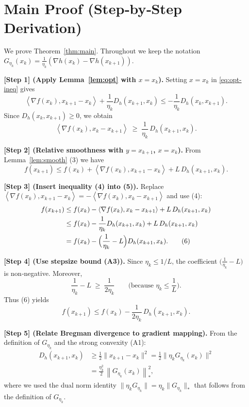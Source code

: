 \documentclass{article}
\newcommand{\grad}{\nabla}
\newcommand{\Dh}{D_h}
\newcommand{\norm}[1]{\left\|#1\right\|}
\newcommand{\inner}[2]{\left\langle #1,#2\right\rangle}
\begin{document}
\section*{Main Proof (Step‑by‑Step Derivation)}
We prove Theorem~\ref{thm:main}. Throughout we keep the notation $G_{\eta_k}(x_k)=\frac{1}{\eta_k}(\nabla h(x_k)-\nabla h(x_{k+1}))$.

\noindent\textbf{[Step 1] (Apply Lemma~\ref{lem:opt} with $x=x_k$).}
Setting $x=x_k$ in \eqref{eq:opt-ineq} gives
\[
\inner{\grad f(x_k)}{x_{k+1}-x_k}
+\frac{1}{\eta_k}\Dh(x_{k+1},x_k)
\le
-\frac{1}{\eta_k}\Dh(x_k,x_{k+1}).
\]
Since $\Dh(x_k,x_{k+1})\ge0$, we obtain
\begin{equation}
\inner{\grad f(x_k)}{x_k-x_{k+1}}
\;\ge\;
\frac{1}{\eta_k}\,\Dh(x_{k+1},x_k). \tag{4}
\end{equation}

\noindent\textbf{[Step 2] (Relative smoothness with $y=x_{k+1}$, $x=x_k$).}
From Lemma~\ref{lem:smooth} (3) we have
\[
f(x_{k+1})\le f(x_k)+\inner{\grad f(x_k)}{x_{k+1}-x_k}+L\,\Dh(x_{k+1},x_k). \tag{5}
\]

\noindent\textbf{[Step 3] (Insert inequality (4) into (5)).}
Replace $\inner{\grad f(x_k)}{x_{k+1}-x_k}= -\inner{\grad f(x_k)}{x_k-x_{k+1}}$ and use (4):
\[
\begin{aligned}
f(x_{k+1})
&\le f(x_k)-\inner{\grad f(x_k)}{x_k-x_{k+1}}+L\,\Dh(x_{k+1},x_k)\\
&\le f(x_k)-\frac{1}{\eta_k}\Dh(x_{k+1},x_k)+L\,\Dh(x_{k+1},x_k)\\
&= f(x_k)-\Bigl(\frac{1}{\eta_k}-L\Bigr)\Dh(x_{k+1},x_k). \tag{6}
\end{aligned}
\]

\noindent\textbf{[Step 4] (Use stepsize bound (A3)).}
Since $\eta_k\le 1/L$, the coefficient $\bigl(\frac{1}{\eta_k}-L\bigr)$ is non‑negative. Moreover,
\[
\frac{1}{\eta_k}-L \;\ge\; \frac{1}{2\eta_k}\qquad\text{(because }\eta_k\le\frac{1}{L}\text{)}.
\]
Thus (6) yields
\begin{equation}
f(x_{k+1})\le f(x_k)-\frac{1}{2\eta_k}\,\Dh(x_{k+1},x_k). \tag{7}
\end{equation}

\noindent\textbf{[Step 5] (Relate Bregman divergence to gradient mapping).}
From the definition of $G_{\eta_k}$ and the strong convexity (A1):
\[
\begin{aligned}
\Dh(x_{k+1},x_k)
&\ge \frac12\|x_{k+1}-x_k\|^{2}
 = \frac12\bigl\|\eta_k G_{\eta_k}(x_k)\bigr\|^{2}\\
&= \frac{\eta_k^{2}}{2}\,\norm{G_{\eta_k}(x_k)}_{*}^{2},
\end{aligned}
\tag{8}
\]
where we used the dual norm identity
$\| \eta_k G_{\eta_k}\| = \eta_k \|G_{\eta_k}\|_{*}$ that follows from the definition of $G_{\eta_k}$.
\end{document}

